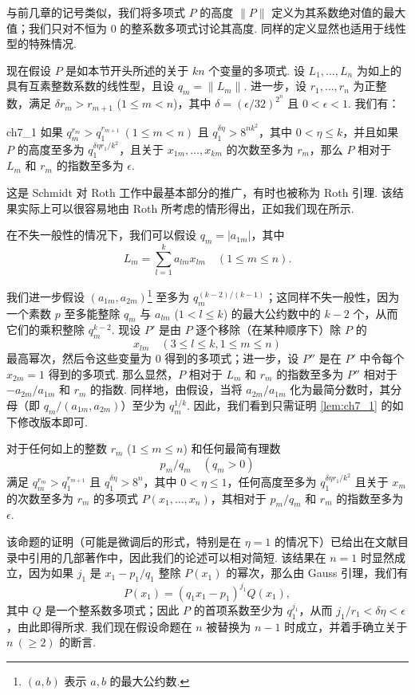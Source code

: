 与前几章的记号类似，我们将多项式 $P$ 的高度 $\|P\|$ 定义为其系数绝对值的最大值；我们只对不恒为 0 的整系数多项式讨论其高度. 同样的定义显然也适用于线性型的特殊情况.

现在假设 $P$ 是如本节开头所述的关于 $kn$ 个变量的多项式. 设 $L_1, \dots, L_n$ 为如上的具有互素整数系数的线性型，且设 $q_m = \|L_m\|$. 进一步，设 $r_1, \dots, r_n$ 为正整数，满足 $\delta r_m > r_{m+1}$ ($1 \le m < n$)，其中 $\delta = (\epsilon/32)^{2^n}$ 且 $0 < \epsilon < 1$. 我们有：

\begin{mylemma}{}{ch7_1}
如果 $q_m^{r_m} > q_1^{r_{m+1}} \ (1 \le m < n)$ 且 $q_1^{\delta \eta} > 8^{nk^2}$，其中 $0 < \eta \le k$，并且如果 $P$ 的高度至多为 $q_1^{\delta \eta r_1/k^2}$，且关于 $x_{1m}, \ldots, x_{km}$ 的次数至多为 $r_m$，那么 $P$ 相对于 $L_m$ 和 $r_m$ 的指数至多为 $\epsilon$.
\end{mylemma}

这是 Schmidt 对 Roth 工作中最基本部分的推广，有时也被称为 Roth 引理. 该结果实际上可以很容易地由 Roth 所考虑的情形得出，正如我们现在所示.

在不失一般性的情况下，我们可以假设 $q_m = |a_{1m}|$，其中
\[L_m = \sum_{l=1}^k a_{lm} x_{lm} \quad (1 \leqslant m \leqslant n).\]

我们进一步假设 $(a_{1m}, a_{2m})$\footnote{$(a, b)$ 表示 $a, b$ 的最大公约数.} 至多为 $q_m^{(k-2)/(k-1)}$；这同样不失一般性，因为一个素数 $p$ 至多能整除 $q_m$ 与 $a_{lm}$ ($1 < l \le k$) 的最大公约数中的 $k-2$ 个，从而它们的乘积整除 $q_m^{k-2}$. 现设 $P'$ 是由 $P$ 逐个移除（在某种顺序下）除 $P$ 的
\[x_{lm} \quad (3 \leqslant l \leqslant k, 1 \leqslant m \leqslant n)\]
最高幂次，然后令这些变量为 0 得到的多项式；进一步，设 $P''$ 是在 $P'$ 中令每个 $x_{2m} = 1$ 得到的多项式. 那么显然，$P$ 相对于 $L_m$ 和 $r_m$ 的指数至多为 $P''$ 相对于 $-a_{2m}/a_{1m}$ 和 $r_m$ 的指数. 同样地，由假设，当将 $a_{2m}/a_{1m}$ 化为最简分数时，其分母（即 $q_m/(a_{1m}, a_{2m})$）至少为 $q_m^{1/k}$. 因此，我们看到只需证明 \autoref{lem:ch7_1} 的如下修改版本即可.

对于任何如上的整数 $r_m$ ($1 \leq m \leq n$) 和任何最简有理数
\[p_m/q_m \quad (q_m > 0)\]
满足 $q_m^{r_m} > q_1^{r_{m+1}}$ 且 $q_1^{\delta \eta} > 8^n$，其中 $0 < \eta \leqslant 1$，任何高度至多为 $q_1^{\delta \eta r_1/k^2}$ 且关于 $x_m$ 的次数至多为 $r_m$ 的多项式 $P(x_1,\dots,x_n)$，其相对于 $p_m/q_m$ 和 $r_m$ 的指数至多为 $\epsilon$.

该命题的证明（可能是微调后的形式，特别是在 $\eta=1$ 的情况下）已给出在文献目录中引用的几部著作中，因此我们的论述可以相对简短. 该结果在 $n=1$ 时显然成立，因为如果 $j_1$ 是 $x_1-p_1/q_1$ 整除 $P(x_1)$ 的幂次，那么由 Gauss 引理，我们有
\[P(x_1) = (q_1x_1 - p_1)^{j_1}Q(x_1),\]
其中 $Q$ 是一个整系数多项式；因此 $P$ 的首项系数至少为 $q_1^{j_1}$，从而 $j_1/r_1 < \delta \eta < \epsilon$，由此即得所求. 我们现在假设命题在 $n$ 被替换为 $n-1$ 时成立，并着手确立关于 $n \ (\geq 2)$ 的断言.

